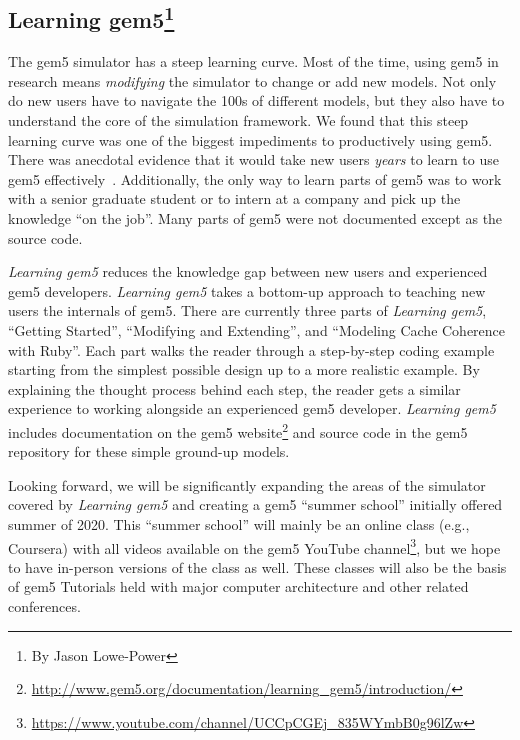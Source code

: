 \subsection[Learning gem5]{Learning gem5\footnote{By Jason Lowe-Power}}
\label{sec:learning}

The gem5 simulator has a steep learning curve.
Most of the time, using gem5 in research means \emph{modifying} the simulator to change or add new models.
Not only do new users have to navigate the 100s of different models, but they also have to understand the core of the simulation framework.
We found that this steep learning curve was one of the biggest impediments to productively using gem5.
There was anecdotal evidence that it would take new users \emph{years} to learn to use gem5 effectively~\cite{Power-gem5horrors-2015}.
Additionally, the only way to learn parts of gem5 was to work with a senior graduate student or to intern at a company and pick up the knowledge ``on the job''.
Many parts of gem5 were not documented except as the source code.

\emph{Learning gem5} reduces the knowledge gap between new users and experienced gem5 developers.
\emph{Learning gem5} takes a bottom-up approach to teaching new users the internals of gem5.
There are currently three parts of \emph{Learning gem5}, ``Getting Started'', ``Modifying and Extending'', and ``Modeling Cache Coherence with Ruby''.
Each part walks the reader through a step-by-step coding example starting from the simplest possible design up to a more realistic example.
By explaining the thought process behind each step, the reader gets a similar experience to working alongside an experienced gem5 developer.
\emph{Learning gem5} includes documentation on the gem5 website\footnote{\url{http://www.gem5.org/documentation/learning_gem5/introduction/}} and source code in the gem5 repository for these simple ground-up models.

Looking forward, we will be significantly expanding the areas of the simulator covered by \emph{Learning gem5} and creating a gem5 ``summer school'' initially offered summer of 2020.
This ``summer school'' will mainly be an online class (e.g., Coursera) with all videos available on the gem5 YouTube channel\footnote{\url{https://www.youtube.com/channel/UCCpCGEj_835WYmbB0g96lZw}}, but we hope to have in-person versions of the class as well.
These classes will also be the basis of gem5 Tutorials held with major computer architecture and other related conferences.
